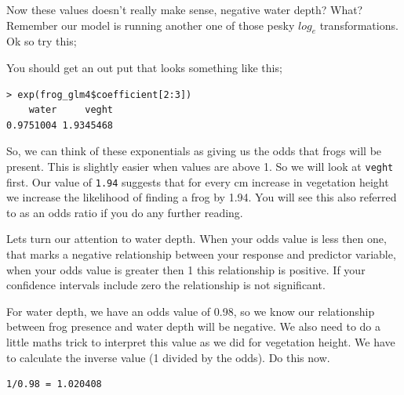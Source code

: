 \documentclass[
]{book}
\newenvironment{Shaded}{\begin{snugshade}}{\end{snugshade}}
\newcommand{\DecValTok}[1]{\textcolor[rgb]{0.00,0.00,0.81}{#1}}
\newcommand{\FunctionTok}[1]{\textcolor[rgb]{0.13,0.29,0.53}{\textbf{#1}}}
\newcommand{\NormalTok}[1]{#1}
\newcommand{\SpecialCharTok}[1]{\textcolor[rgb]{0.81,0.36,0.00}{\textbf{#1}}}
\begin{document}
\begin{Shaded}
\end{Shaded}

Now these values doesn't really make sense, negative water depth? What? Remember our model is running another one of those pesky \(log_e\) transformations. Ok so try this;

\begin{Shaded}
\end{Shaded}

You should get an out put that looks something like this;

\begin{verbatim}
> exp(frog_glm4$coefficient[2:3])
    water     veght 
0.9751004 1.9345468 
\end{verbatim}

So, we can think of these exponentials as giving us the odds that frogs will be present. This is slightly easier when values are above 1. So we will look at \texttt{veght} first. Our value of \texttt{1.94} suggests that for every cm increase in vegetation height we increase the likelihood of finding a frog by 1.94. You will see this also referred to as an odds ratio if you do any further reading.

Lets turn our attention to water depth. When your odds value is less then one, that marks a negative relationship between your response and predictor variable, when your odds value is greater then 1 this relationship is positive. If your confidence intervals include zero the relationship is not significant.

For water depth, we have an odds value of 0.98, so we know our relationship between frog presence and water depth will be negative. We also need to do a little maths trick to interpret this value as we did for vegetation height. We have to calculate the inverse value (1 divided by the odds). Do this now.

\begin{verbatim}
1/0.98 = 1.020408
\end{verbatim}
\end{document}
